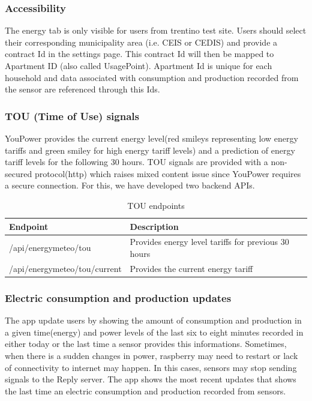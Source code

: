 \subsubsection{Accessibility}
The energy tab is only visible for users from trentino test site. Users should select their  corresponding municipality area (i.e. CEIS or CEDIS) and provide a contract Id in the settings page. This contract Id will then be mapped to Apartment ID (also called UsagePoint). Apartment Id is unique for each household and data associated with consumption and production recorded from the sensor are referenced through  this Ids.

\subsubsection{TOU (Time of Use) signals}
YouPower provides the current energy level(red smileys representing  low energy  tariffs and green smiley for high energy tariff levels) and a prediction of energy tariff levels for the following 30 hours. TOU signals are provided with a non-secured protocol(http) which raises mixed content issue since YouPower requires a secure connection. For this, we have developed two backend APIs.

\begin{table}[h!]
\caption{TOU endpoints}\label{tab:app_nav}
\begin{center} \footnotesize 
\begin{tabular}{ l p{6cm}}
\hline
\textbf{Endpoint}  &
\textbf{Description}  \\ \hline

/api/energymeteo/tou  & 
Provides energy level tariffs for previous 30 hours
\\ 
/api/energymeteo/tou/current & Provides the current energy tariff \\ 
 \hline
\end{tabular}
\end{center} 
\end{table}

\subsubsection{Electric consumption and production updates}
The app update users by showing the amount of consumption and production in a given time(energy) and power levels of the last six to eight minutes recorded in either today or the last time a sensor provides this informations. Sometimes, when there is a sudden changes in power, raspberry may need  to restart or  lack of connectivity to internet may happen. In this cases, sensors may stop sending signals to the Reply server. The app shows the most recent updates that shows the last time an electric consumption and production recorded from sensors.

